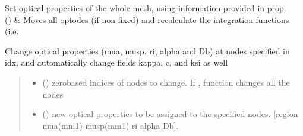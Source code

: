 \documentclass[letterpaper,10pt,english]{sphinxmanual}
\begin{document}
\begin{fulllineitems}
\begin{savenotes}
\begin{tabulary}{\linewidth}[t]{}
Set optical properties of the whole mesh, using information provided in prop.
\\
\sphinxhline
\sphinxAtStartPar
{\hyperref[\detokenize{_autosummary/nirfasterff.base.dcs_mesh.dcsmesh:nirfasterff.base.dcs_mesh.dcsmesh.touch_optodes}]{}}()
&
\sphinxAtStartPar
Moves all optodes (if non fixed) and recalculate the integration functions (i.e.
\\
\sphinxbottomrule
\end{tabulary}
\sphinxtableafterendhook\par
\sphinxattableend\end{savenotes}

\begin{fulllineitems}
\label{\detokenize{_autosummary/nirfasterff.base.dcs_mesh.dcsmesh:nirfasterff.base.dcs_mesh.dcsmesh.change_prop}}
\pysigstartsignatures
{}
\pysigstopsignatures
\sphinxAtStartPar
Change optical properties (mua, musp, ri, alpha and Db) at nodes specified in idx, and automatically change fields kappa, c, and ksi as well
\begin{quote}\begin{description}
\begin{itemize}
\item {} 
\sphinxAtStartPar
{} () \textendash{} zero\sphinxhyphen{}based indices of nodes to change. If , function changes all the nodes

\item {} 
\sphinxAtStartPar
{} () \textendash{} new optical properties to be assigned to the specified nodes. {[}region mua(mm\sphinxhyphen{}1) musp(mm\sphinxhyphen{}1) ri alpha Db{]}.


\end{itemize}
\end{description}
\end{quote}
\end{fulllineitems}
\end{fulllineitems}
\end{document}
